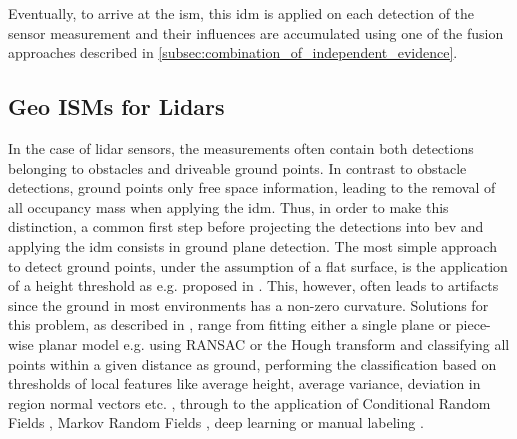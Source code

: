 Eventually, to arrive at the \gls{ism}, this \gls{idm} is applied on each detection of the sensor measurement and their influences are accumulated using one of the fusion approaches described in \ref{subsec:combination_of_independent_evidence}.
%
\subsection{Geo ISMs for Lidars}
\label{subsec:geo_ism_lidar}
In the case of lidar sensors, the measurements often contain both detections belonging to obstacles and driveable ground points. In contrast to obstacle detections, ground points only free space information, leading to the removal of all occupancy mass when applying the \gls{idm}. Thus, in order to make this distinction, a common first step before projecting the detections into \gls{bev} and applying the \gls{idm} consists in ground plane detection. 
The most simple approach to detect ground points, under the assumption of a flat surface, is the application of a height threshold as e.g. proposed in \cite{thrun2006stanley}. This, however, often leads to artifacts since the ground in most environments has a non-zero curvature. Solutions for this problem, as described in \cite{narksri2018slope}, range from fitting either a single plane or piece-wise planar model e.g. using RANSAC or the Hough transform \cite{fischler1981random,hough1962method,oliveira2016scene,tian2020fast} and classifying all points within a given distance as ground, performing the classification based on thresholds of local features like average height, average variance, deviation in region normal vectors etc. \cite{li2014motion,asvadi2015detection}, through to the application of Conditional Random Fields \cite{rummelhard2017ground}, Markov Random Fields \cite{guo2011graph}, deep learning or manual labeling \cite{velas2018cnn}. 
%
